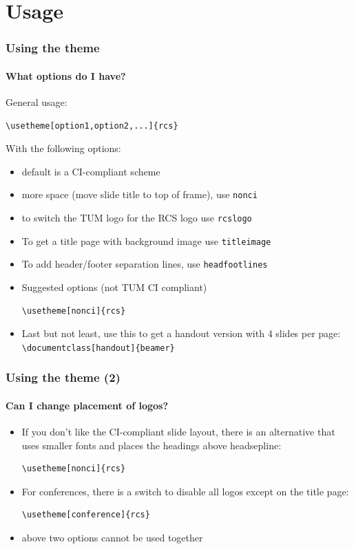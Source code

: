 \documentclass[
presentation, %
]{beamer}
\begin{document}
\section{Usage}
\begin{frame}[fragile]
  \frametitle{Using the theme} 
  \framesubtitle{What options do I have?}
  General usage: 
    \begin{lstlisting}
\usetheme[option1,option2,...]{rcs}
    \end{lstlisting}
  With the following options:
  \begin{itemize}
  \item default is a CI-compliant scheme
  \item more space (move slide title to top of frame), use \texttt{nonci}
  \item to switch the TUM logo for the RCS logo use \texttt{rcslogo}
  \item To get a title page with background image use \texttt{titleimage}
  \item To add header/footer separation lines, use \texttt{headfootlines}
  \item Suggested options (not TUM CI compliant)
    \lstset{language=TeX}
    \begin{lstlisting}
\usetheme[nonci]{rcs}
    \end{lstlisting}        
  \item \alert{Last but not least}, use this to get a handout version with 4 slides per page: \texttt{\textbackslash documentclass[handout]\{beamer\}}
  \end{itemize}
\end{frame}

\begin{frame}[fragile]
  \frametitle{Using the theme (2)} 
  \framesubtitle{Can I change placement of logos?}
  \begin{itemize}
  \item If you don't like the CI-compliant slide layout, there is an alternative that uses smaller fonts and places the headings above headsepline:
    \begin{lstlisting}
\usetheme[nonci]{rcs}
    \end{lstlisting}
  \item For conferences, there is a switch to disable all logos except on the title page:
    \begin{lstlisting}
\usetheme[conference]{rcs}
    \end{lstlisting}
  \item \alert{above two options cannot be used together}
  \end{itemize}
\end{frame}
\end{document}
